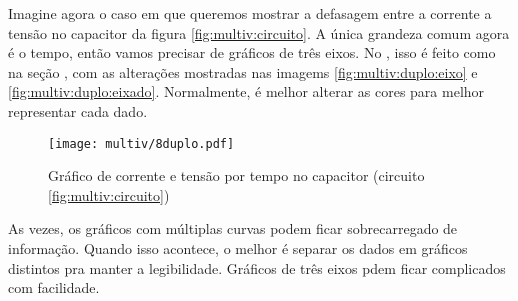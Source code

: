     Imagine agora o caso em que queremos mostrar a defasagem entre a corrente a tensão no capacitor da figura \ref{fig:multiv:circuito}. A única grandeza comum agora é o tempo, então vamos precisar de gráficos de três eixos. No \software, isso é feito como na seção , com as alterações mostradas nas imagems \ref{fig:multiv:duplo:eixo} e \ref{fig:multiv:duplo:eixado}. Normalmente, é melhor alterar as cores para melhor representar cada dado.

    \begin{figure}[htbp]
        \centering
        \texttt{[image: multiv/8duplo.pdf]}

        \caption{Gráfico de corrente e tensão por tempo no capacitor (circuito \ref{fig:multiv:circuito})}
        \label{fig:multiv:duplo}
    \end{figure}

    \begin{nota}
        As vezes, os gráficos com múltiplas curvas podem ficar sobrecarregado de informação. Quando isso acontece, o melhor é separar os dados em gráficos distintos pra manter a legibilidade. Gráficos de três eixos pdem ficar complicados com facilidade.
    \end{nota}
